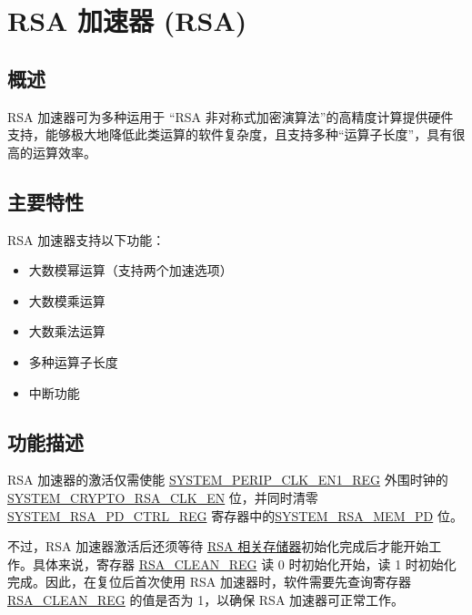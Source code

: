 \documentclass[main\_\_CN.tex]{subfiles}
\begin{document}

\ifglobal
\else
    {\let\clearpage\relax \listoftodos}
    \tableofcontents
\fi



\hypertarget{rsa}{}

\chapter{RSA 加速器 (RSA)}\label{mod:rsa}

\section{概述}

RSA 加速器可为多种运用于 “RSA 非对称式加密演算法”的高精度计算提供硬件支持，能够极大地降低此类运算的软件复杂度，且支持多种“运算子长度”，具有很高的运算效率。

\section{主要特性}

RSA 加速器支持以下功能：
\begin{itemize}
    \item 大数模幂运算（支持两个加速选项）
    \item 大数模乘运算
    \item 大数乘法运算
    \item 多种运算子长度
    \item 中断功能
\end{itemize}

\section{功能描述}

RSA 加速器的激活仅需使能 \hyperref[regdesc:SYSTEMPERIPCLKEN1REG]{SYSTEM\_PERIP\_CLK\_EN1\_REG} 外围时钟的 \hyperref[fielddesc:SYSTEMCRYPTORSACLKEN]{SYSTEM\_CRYPTO\_RSA\_CLK\_EN} 位，并同时清零 \hyperref[regdesc:SYSTEMRSAPDCTRLREG]{SYSTEM\_RSA\_PD\_CTRL\_REG} 寄存器中的\hyperref[fielddesc:SYSTEMRSAMEMPD]{SYSTEM\_RSA\_MEM\_PD} 位。

不过，RSA 加速器激活后还须等待 \hyperref[sec:mem-sum]{RSA 相关存储器}初始化完成后才能开始工作。具体来说，寄存器 \hyperref[regdesc:RSACLEANREG]{RSA\_CLEAN\_REG} 读 0 时初始化开始，读 1 时初始化完成。因此，在复位后首次使用 RSA 加速器时，软件需要先查询寄存器 \hyperref[regdesc:RSACLEANREG]{RSA\_CLEAN\_REG} 的值是否为 1，以确保 RSA 加速器可正常工作。
\end{document}
